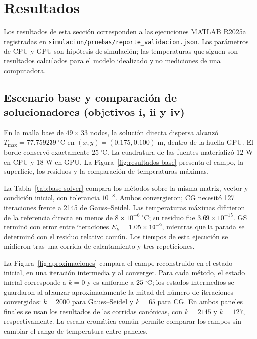 \section{Resultados}

Los resultados de esta secci\'on corresponden a las ejecuciones MATLAB R2025a registradas en \texttt{simulacion/pruebas/reporte\_validacion.json}. Los par\'ametros de CPU y GPU son hip\'otesis de simulaci\'on; las temperaturas que siguen son resultados calculados para el modelo idealizado y no mediciones de una computadora.

\subsection{Escenario base y comparaci\'on de solucionadores (objetivos i, ii y iv)}

En la malla base de $49\times33$ nodos, la soluci\'on directa dispersa alcanz\'o $T_{\max}=77.759239\ ^\circ$C en $(x,y)=(0.175,0.100)$ m, dentro de la huella GPU. El borde conserv\'o exactamente $25\ ^\circ$C. La cuadratura de las fuentes materializ\'o $12$ W en CPU y $18$ W en GPU. La Figura~\ref{fig:resultados-base} presenta el campo, la superficie, los residuos y la comparaci\'on de temperaturas m\'aximas.

La Tabla~\ref{tab:base-solver} compara los m\'etodos sobre la misma matriz, vector y condici\'on inicial, con tolerancia $10^{-8}$. Ambos convergieron; CG necesit\'o 127 iteraciones frente a 2145 de Gauss--Seidel. Las temperaturas m\'aximas difirieron de la referencia directa en menos de $8\times10^{-6}\ ^\circ$C; su residuo fue $3.69\times10^{-15}$. GS termin\'o con error entre iteraciones $E_k=1.05\times10^{-9}$, mientras que la parada se determin\'o con el residuo relativo com\'un. Los tiempos de esta ejecuci\'on se midieron tras una corrida de calentamiento y tres repeticiones.

La Figura~\ref{fig:aproximaciones} compara el campo reconstruido en el estado inicial, en una iteraci\'on intermedia y al converger. Para cada m\'etodo, el estado inicial corresponde a $k=0$ y es uniforme a $25\ ^\circ$C; los estados intermedios se guardaron al alcanzar aproximadamente la mitad del n\'umero de iteraciones convergidas: $k=2000$ para Gauss--Seidel y $k=65$ para CG. En ambos paneles finales se usan los resultados de las corridas can\'onicas, con $k=2145$ y $k=127$, respectivamente. La escala crom\'atica com\'un permite comparar los campos sin cambiar el rango de temperatura entre paneles.

